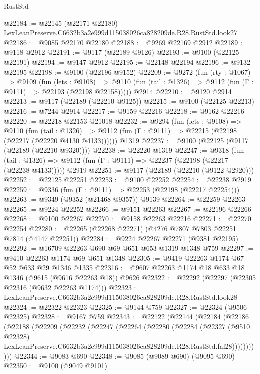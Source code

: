 \begin{lexlean}{RustStd}
\begin{coremodule}
@22184 := @22145
    (@22171 @22180)
    LexLeanPreserve.C6632b3a2e999d115038026ca828209de.R28.RustStd.look27
@22186 := @9085 @22170 @22180
@22188 := @9269 @22169 @2912
@22189 := @9118 @2912
@22191 := @9117 (@22189 @9126)
@22193 := @9100 (@22125 @22191)
@22194 := @9147 @2912
@22195 := @22148 @22194
@22196 := @9132 @22195
@22198 := @9100 (@22196 @9152)
@22209 := @9272
    (fun (rty : @1067) =>
    @9109
      (fun (lets : @9108) =>
      @9110 (fun (tail : @1326) => @9112 (fun (Γ : @9111) => @22193 (@22198 @22158)))))
    @2914
@22210 := @9120 @2914
@22213 := @9117 (@22189 (@22210 @9125))
@22215 := @9100 (@22125 @22213)
@22216 := @7244 @2914
@22217 := @9159 @22216
@22218 := @9162 @22216
@22220 := @22218 @22153 @21018
@22232 := @9294
    (fun (lets : @9108) =>
    @9110
      (fun (tail : @1326) =>
      @9112 (fun (Γ : @9111) => @22215 (@22198 (@22217 (@22220 @4130 @4133))))))
    @1319
@22237 := @9100 (@22125 (@9117 (@22189 (@22210 @9320))))
@22238 := @22220 @1319
@22247 := @9318
    (fun (tail : @1326) => @9112 (fun (Γ : @9111) => @22237 (@22198 (@22217 (@22238 @4133)))))
    @2919
@22251 := @9117 (@22189 (@22210 (@9122 @2920)))
@22252 := @22125 @22251
@22253 := @9100 @22252
@22254 := @22238 @2919
@22259 := @9336 (fun (Γ : @9111) => @22253 (@22198 (@22217 @22254)))
@22263 := @9349 (@9352 (@21468 @9357)) @9139
@22264 := @22259 @22263
@22265 := @9224 @22252
@22266 := @9151 @22263
@22267 := @22196 @22266
@22268 := @9100 @22267
@22270 := @9158 @22263 @22216
@22271 := @22270 @22254
@22280 := @22265 (@22268 @22271) (@4276 @7807 @7803 @22251 @7814 (@4147 @22251))
@22284 := @9224 @22267 @22271 (@9381 @22195)
@22292 := @16709 @22263 @690 @69 @651 @653 @1319 @1348 @759
@22297 := @9410 @22263 @1174 @69 @651 @1348
@22305 := @9419 @22263 @1174 @67 @52 @633 @29 @1346 @1335
@22316 := @9607 @22263 @1174 @18 @633 @18 @1346 (@9615 (@9616 @22263 @18)) @9626
@22322 := @22292 (@22297 (@22305 @22316 (@9632 @22263 @1174)))
@22323 := LexLeanPreserve.C6632b3a2e999d115038026ca828209de.R28.RustStd.look28
@22324 := @22322 @22323
@22325 := @9144 @759
@22327 := @22324 (@9506 @22325)
@22328 := @9167 @759
@22343 := @22122
    (@22144
      (@22184
        (@22186
          (@22188
            (@22209
              (@22232
                (@22247
                  (@22264
                    (@22280
                      (@22284
                        (@22327
                          (@9510 @22328)
                          LexLeanPreserve.C6632b3a2e999d115038026ca828209de.R28.RustStd.fal28)))))))))))
@22344 := @9083 @690
@22348 := @9085 (@9089 @690) (@9095 @690)
@22350 := @9100 (@9049 @9101)

\end{coremodule}
\end{lexlean}
